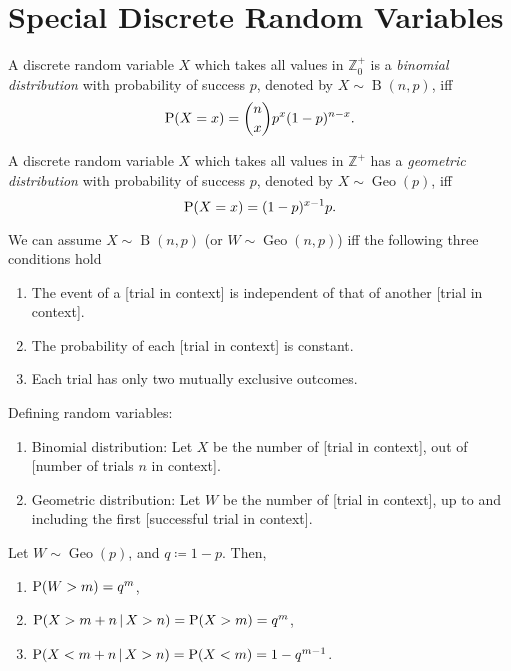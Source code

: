 \documentclass[oneside]{book}
\begin{document}
\chapter{Special Discrete Random Variables}
\begin{definition}{}{}
  A discrete random variable \(X\) which takes all values in \(\mathbb{Z}^{+}_{0}\) is a \emph{binomial distribution} with probability of success \(p\), denoted by \(X \sim \operatorname{B}(n,p)\), iff
  \[\operatorname{P}(X=x)=\binom{n}{x}p^x(1-p)^{n-x}.\]
\end{definition}
\begin{definition}{}{}
  A discrete random variable \(X\) which takes all values in \(\mathbb{Z}^{+}\) has a \emph{geometric distribution} with probability of success \(p\), denoted by \(X \sim \operatorname{Geo}(p)\), iff
  \[\operatorname{P}(X=x)=(1-p)^{x-1}p.\]
\end{definition}
\begin{note}
  We can assume \(X \sim \operatorname{B}(n,p)\) (or \(W \sim \operatorname{Geo}(n,p)\)) iff the following three conditions hold
  \begin{enumerate}
    \item The event of a [trial in context] is independent of that of another [trial in context].
    \item The probability of each [trial in context] is constant.
    \item Each trial has only two mutually exclusive outcomes.
  \end{enumerate}
\end{note}
\begin{note}
  Defining random variables:
  \begin{enumerate}
    \item Binomial distribution: Let \(X\) be the number of [trial in context], out of [number of trials \(n\) in context]. 
    \item Geometric distribution: Let \(W\) be the number of [trial in context], up to and including the first [successful trial in context].
  \end{enumerate}
\end{note}
\begin{note}
  Let \(W \sim \operatorname{Geo}(p)\), and \(q\coloneq 1-p\). Then,
  \begin{enumerate}
    \item \(\operatorname{P}(W>m)=q^m\),
    \item \(\operatorname{P}(X>m+n \,\vert\, X>n)=\operatorname{P}(X>m)=q^m\),\item \(\operatorname{P}(X<m+n \,\vert\, X>n)=\operatorname{P}(X<m)=1-q^{m-1}\).
  \end{enumerate}
\end{note}
\end{document}
